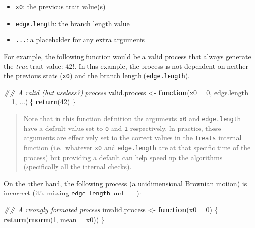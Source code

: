 \documentclass[
]{book}
\newenvironment{Shaded}{\begin{snugshade}}{\end{snugshade}}
\newcommand{\CommentTok}[1]{\textcolor[rgb]{0.56,0.35,0.01}{\textit{#1}}}
\newcommand{\ControlFlowTok}[1]{\textcolor[rgb]{0.13,0.29,0.53}{\textbf{#1}}}
\newcommand{\DataTypeTok}[1]{\textcolor[rgb]{0.13,0.29,0.53}{#1}}
\newcommand{\DecValTok}[1]{\textcolor[rgb]{0.00,0.00,0.81}{#1}}
\newcommand{\KeywordTok}[1]{\textcolor[rgb]{0.13,0.29,0.53}{\textbf{#1}}}
\newcommand{\NormalTok}[1]{#1}
\newcommand{\StringTok}[1]{\textcolor[rgb]{0.31,0.60,0.02}{#1}}
\providecommand{\tightlist}{%
  \setlength{\itemsep}{0pt}\setlength{\parskip}{0pt}}
\begin{document}
\begin{itemize}
\tightlist
\item
  \texttt{x0}: the previous trait value(s)
\item
  \texttt{edge.length}: the branch length value
\item
  \texttt{...}: a placeholder for any extra arguments
\end{itemize}

For example, the following function would be a valid process that always generate the \emph{true} trait value: 42!.
In this example, the process is not dependent on neither the previous state (\texttt{x0}) and the branch length (\texttt{edge.length}).

\begin{Shaded}
\begin{Highlighting}[]
\CommentTok{\#\# A valid (but useless?) process}
\NormalTok{valid.process \textless{}{-}}\StringTok{ }\ControlFlowTok{function}\NormalTok{(}\DataTypeTok{x0 =} \DecValTok{0}\NormalTok{, }\DataTypeTok{edge.length =} \DecValTok{1}\NormalTok{, ...) \{}
    \KeywordTok{return}\NormalTok{(}\DecValTok{42}\NormalTok{)}
\NormalTok{\}}
\end{Highlighting}
\end{Shaded}

\begin{quote}
Note that in this function definition the arguments \texttt{x0} and \texttt{edge.length} have a default value set to \texttt{0} and \texttt{1} respectively. In practice, these arguments are effectively set to the correct values in the \texttt{treats} internal function (i.e.~whatever \texttt{x0} and \texttt{edge.length} are at that specific time of the process) but providing a default can help speed up the algorithms (specifically all the internal checks).
\end{quote}

On the other hand, the following process (a unidimensional Brownian motion) is incorrect (it's missing \texttt{edge.length} and \texttt{...}):

\begin{Shaded}
\begin{Highlighting}[]
\CommentTok{\#\# A wrongly formated process}
\NormalTok{invalid.process \textless{}{-}}\StringTok{ }\ControlFlowTok{function}\NormalTok{(}\DataTypeTok{x0 =} \DecValTok{0}\NormalTok{) \{}
    \KeywordTok{return}\NormalTok{(}\KeywordTok{rnorm}\NormalTok{(}\DecValTok{1}\NormalTok{, }\DataTypeTok{mean =}\NormalTok{ x0))}
\NormalTok{\}}
\end{Highlighting}
\end{Shaded}
\end{document}
